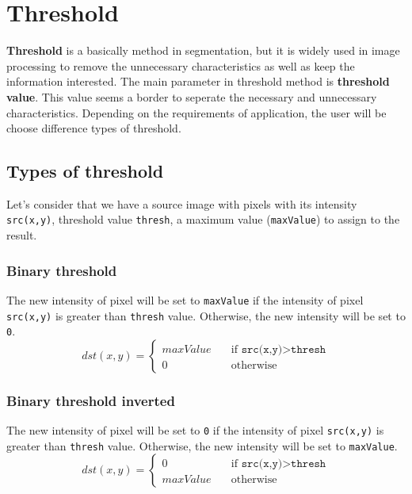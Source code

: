 \section{Threshold}
\textbf{Threshold} is a basically method in segmentation, but it is widely used in image processing to remove the unnecessary characteristics as well as keep the information interested. The main parameter in threshold method is \textbf{threshold value}. This value seems a border to seperate the necessary and unnecessary characteristics. Depending on the requirements of application, the user will be choose difference types of threshold.\\[0.2cm]  
\subsection{Types of threshold}
Let's consider that we have a source image with pixels with its intensity \texttt{src(x,y)}, threshold value \texttt{thresh}, a maximum value (\texttt{maxValue}) to assign to the result. 
\subsubsection{Binary threshold}
The new intensity of pixel will be set to \texttt{maxValue} if the intensity of pixel \texttt{src(x,y)} is greater than \texttt{thresh} value. Otherwise, the new intensity will be set to \texttt{0}.
\begin{equation}	
		dst(x,y) = 
		\begin{cases}
			maxValue & \quad \text{if }\texttt{src(x,y)} > \texttt{thresh} \\
			0 & \quad \text{otherwise}
		\end{cases}	
\end{equation}
\subsubsection{Binary threshold inverted}
The new intensity of pixel will be set to \texttt{0} if the intensity of pixel \texttt{src(x,y)} is greater than \texttt{thresh} value. Otherwise, the new intensity will be set to \texttt{maxValue}.
\begin{equation}	
		dst(x,y) = 
		\begin{cases}
			0 & \quad \text{if }\texttt{src(x,y)} > \texttt{thresh} \\
			maxValue & \quad \text{otherwise}
		\end{cases}	
\end{equation}
